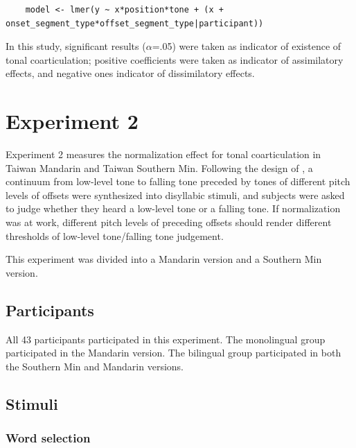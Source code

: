 \begin{lstlisting}
    model <- lmer(y ~ x*position*tone + (x + onset_segment_type*offset_segment_type|participant))
\end{lstlisting}

In this study, significant results ($\alpha$=.05) were taken as indicator of existence of tonal coarticulation; positive coefficients were taken as indicator of assimilatory effects, and negative ones indicator of dissimilatory effects.

\section{Experiment 2}\label{section:Experiment2}

Experiment 2 measures the normalization effect for tonal coarticulation in Taiwan Mandarin and Taiwan Southern Min. Following the design of \cite{Zhangetal2022}, a continuum from low-level tone to falling tone preceded by tones of different pitch levels of offsets were synthesized into disyllabic stimuli, and subjects were asked to judge whether they heard a low-level tone or a falling tone. If normalization was at work, different pitch levels of preceding offsets should render different thresholds of low-level tone/falling tone judgement.

This experiment was divided into a Mandarin version and a Southern Min version.

\subsection{Participants}
All 43 participants participated in this experiment. The monolingual group participated in the Mandarin version. The bilingual group participated in both the Southern Min and Mandarin versions.

\subsection{Stimuli}
\subsubsection{Word selection}


